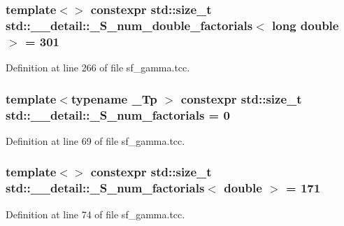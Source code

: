 \subsubsection[{\+\_\+\+S\+\_\+num\+\_\+double\+\_\+factorials$<$ long double $>$}]{\setlength{\rightskip}{0pt plus 5cm}template$<$$>$ constexpr std\+::size\+\_\+t {\bf std\+::\+\_\+\+\_\+detail\+::\+\_\+\+S\+\_\+num\+\_\+double\+\_\+factorials}$<$ long double $>$ = 301}\label{namespacestd_1_1____detail_a46272d8c219cfca2054da99471ed3711}


Definition at line 266 of file sf\+\_\+gamma.\+tcc.

\hypertarget{namespacestd_1_1____detail_a671f3ba94c1b06be87992486bca37426}{}
\subsubsection[{\+\_\+\+S\+\_\+num\+\_\+factorials}]{\setlength{\rightskip}{0pt plus 5cm}template$<$typename \+\_\+\+Tp $>$ constexpr std\+::size\+\_\+t std\+::\+\_\+\+\_\+detail\+::\+\_\+\+S\+\_\+num\+\_\+factorials = 0}\label{namespacestd_1_1____detail_a671f3ba94c1b06be87992486bca37426}


Definition at line 69 of file sf\+\_\+gamma.\+tcc.

\hypertarget{namespacestd_1_1____detail_ad415b9ec36471d7aca4ebcd22cb7b216}{}
\subsubsection[{\+\_\+\+S\+\_\+num\+\_\+factorials$<$ double $>$}]{\setlength{\rightskip}{0pt plus 5cm}template$<$$>$ constexpr std\+::size\+\_\+t {\bf std\+::\+\_\+\+\_\+detail\+::\+\_\+\+S\+\_\+num\+\_\+factorials}$<$ double $>$ = 171}\label{namespacestd_1_1____detail_ad415b9ec36471d7aca4ebcd22cb7b216}


Definition at line 74 of file sf\+\_\+gamma.\+tcc.

\hypertarget{namespacestd_1_1____detail_a3a29651303ca2222246ef6f0a17e92ec}{}
